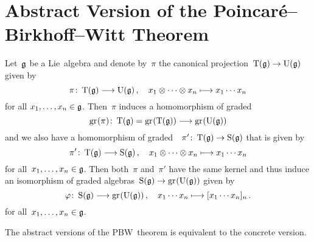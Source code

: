 \section{Abstract Version of the Poincar\'{e}--Birkhoff--Witt Theorem}


\begin{theorem}
  \label{pbw abstract}
  Let~$\mathfrak{g}$ be a Lie~algebra and denote by~$\pi$ the canonical projection~$\Tensor(\glie) \to \Univ(\glie)$ given by
  \[
    \pi
    \colon
    \Tensor(\glie)
    \to
    \Univ(\glie) \,,
    \quad
    x_1 \tensor \dotsb \tensor x_n
    \mapsto
    x_1 \dotsm x_n
  \]
  for all $x_1, \dotsc, x_n \in \mathfrak{g}$.
  Then~$\pi$ induces a homomorphism of graded~{\algebras{$\kf$}}
  \[
    \gr(\pi)
    \colon
    \Tensor(\glie)
    =
    \gr(\Tensor(\glie))
    \to
    \gr(\Univ(\glie))
  \]
  and we also have a homomorphism of graded~{\algebras{$\kf$}}~$\pi' \colon \Tensor(\glie) \to \Symm(\glie)$ that  is given by
  \[
    \pi'
    \colon
    \Tensor(\glie)
    \to
    \Symm(\glie) \,,
    \quad
    x_1 \tensor \dotsb \tensor x_n
    \mapsto
    x_1 \dotsm x_n
  \]
  for all~$x_1, \dotsc, x_n \in \mathfrak{g}$.
  Then both~$\pi$ and~$\pi'$ have the same kernel and thus induce an isomorphism of graded algebras~$\Symm(\glie) \to \gr(\Univ(\glie))$ given by
  \begin{equation}
    \label{definition of abstract pbw isomorphism}
    \varphi
    \colon
    \Symm(\glie)
    \to
    \gr(\Univ(\glie)) \,,
    \quad
    x_1 \dotsm x_n
    \mapsto
    [x_1 \dotsm x_n]_n \,.
  \end{equation}
  for all~$x_1, \dotsc, x_n \in \mathfrak{g}$.
\end{theorem}


\begin{proposition}
  The abstract versions of the PBW~theorem is equivalent to the concrete version.
\end{proposition}


